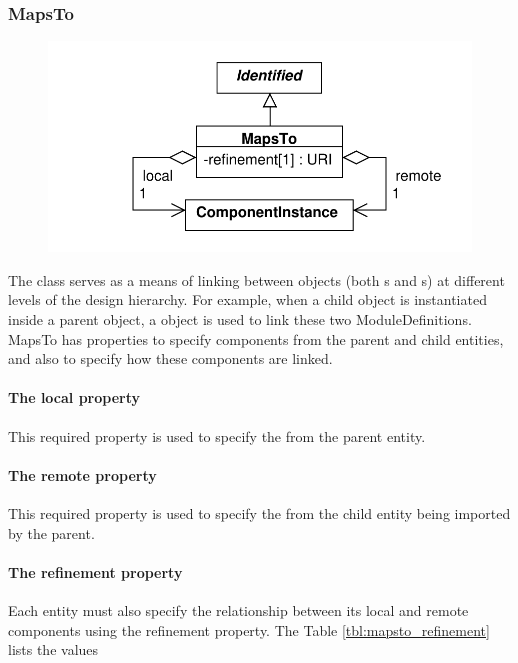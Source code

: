 \subsubsection{MapsTo}
\label{sec:MapsTo}

\begin{figure}[ht]
\begin{center}
\includegraphics[scale=0.6]{uml/maps_to}
\caption[]{}
\label{uml:maps_to}
\end{center}
\end{figure}
The  class serves as a means of linking between  objects (both s and s) at different levels of the design hierarchy. For example, when a child  object is instantiated inside a parent  object, a  object is used to link these two ModuleDefinitions. MapsTo has properties to specify components from the parent and child entities, and also to specify how these components are linked.

\paragraph{The local property}
This required property is used to specify the  from the parent entity.

\paragraph{The remote property}
This required property is used to specify the  from the child entity being imported by the parent.

\paragraph{The refinement property}
Each  entity must also specify the relationship between its local and remote components using the refinement property. The Table \ref{tbl:mapsto_refinement} lists the values 

